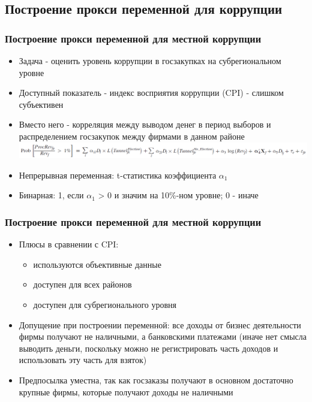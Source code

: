 \subsection{Построение прокси переменной для коррупции}

\begin{frame}
\frametitle{Построение прокси переменной для местной коррупции}
	\begin{itemize}
		\item Задача - оценить уровень коррупции в госзакупках на субрегиональном уровне
		\item Доступный показатель - индекс восприятия коррупции (CPI) - слишком субъективен
		\item Вместо него - корреляция между выводом денег в период выборов и распределением госзакупок
		 между фирмами в данном районе
		\includegraphics[scale=0.32]{images/kek1}
		\item Непрерывная переменная: t-статистика коэффициента $\alpha_1$
		\item Бинарная: 1, если $\alpha_1$ > 0 и значим на 10\%-ном уровне; 0 - иначе
	\end{itemize}
\end{frame}


\begin{frame}
\frametitle{Построение прокси переменной для местной коррупции}
	\begin{itemize}
		\item Плюсы в сравнении с CPI: 
		\begin{itemize}
			\item используются объективные данные
			\item доступен для всех районов
			\item доступен для субрегионального уровня
		\end{itemize} 
		\item Допущение при построении переменной: все доходы от бизнес деятельности фирмы получают не наличными, а банковскими платежами (иначе нет смысла выводить деньги, поскольку можно не регистрировать часть доходов и использовать эту часть для взяток)
		\item Предпосылка уместна, так как госзаказы получают в основном достаточно крупные фирмы, которые получают доходы не наличными 
	\end{itemize}
\end{frame}

